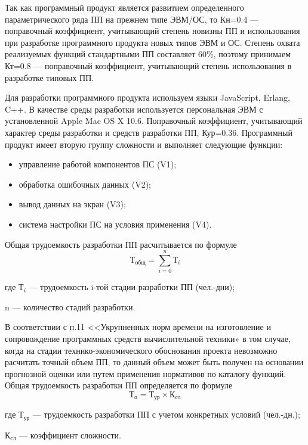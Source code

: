 Так как программный продукт является развитием определенного параметрического ряда ПП на прежнем типе ЭВМ/ОС,
то Кн=0.4 --- поправочный коэффициент, учитывающий степень новизны ПП и использования при разработке
программного продукта новых типов ЭВМ и ОС. Степень  охвата реализуемых функций стандартными ПП составляет 60\%, 
поэтому принимаем Кт=0.8 --- поправочный коэффициент, учитывающий степень 
использования в разработке типовых ПП.

Для разработки программного продукта используем языки JavaScript, Erlang, C++.
В качестве среды разработки используется персональная ЭВМ с установленной Apple Mac OS X 10.6.
Поправочный коэффициент, учитывающий характер среды разработки и средств разработки ПП, Кур=0.36.
Программный продукт имеет вторую группу сложности и выполняет следующие функции:

\begin{itemize}
    \item{} управление работой компонентов ПС (V1);
    \item{} обработка ошибочных данных (V2);
    \item{} вывод данных на экран (V3);
    \item{} система настройки ПС на условия применения (V4).
\end{itemize}

Общая трудоемкость разработки ПП расчитывается по формуле
\begin{equation}
\textrm{Т}_{\textrm{общ}} = \sum_{i=0}^{n}\textrm{Т}_i
\end{equation}

\begin{ESKDexplanation}
    \item[где ]{} $\textrm{Т}_i$ --- трудоемкость i-той стадии разработки ПП (чел.-дни);
    \item{} n --- количество стадий разработки.
\end{ESKDexplanation}

В соответствии с п.11 <<Укрупненных норм времени на изготовление и сопровождение программных
средств вычислительной техники» в том случае, когда на стадии технико-экономического
обоснования проекта невозможно расчитать точный объем ПП, то данный объем может быть 
получен на основании прогнозной оценки или путем применения нормативов по каталогу функций.
Общая трудоемкость разработки ПП определяется по формуле
\begin{equation}
	\textrm{Т}_{\textrm{о}} = \textrm{Т}_{\textrm{ур}} \times{} \textrm{К}_{\textrm{сл}}
\end{equation}
\begin{ESKDexplanation}
    \item[где ]{} $\textrm{Т}_{\textrm{ур}}$ --- трудоемкость разработки ПП с учетом конкретных условий (чел.-дн.);
    \item{} $\textrm{К}_{\textrm{сл}}$ --- коэффициент сложности.
\end{ESKDexplanation}

